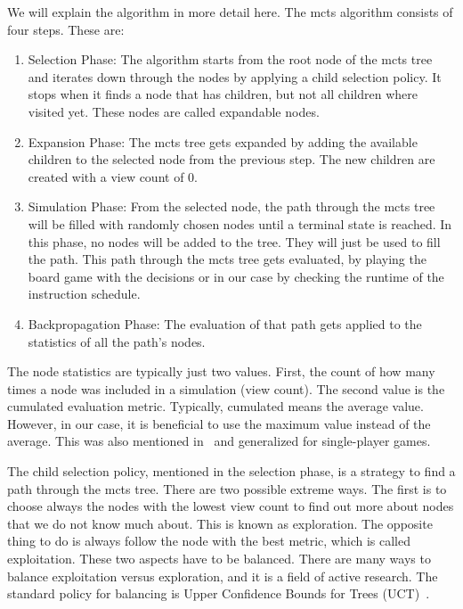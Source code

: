 We will explain the algorithm in more detail here.
The \ac{mcts} algorithm consists of four steps.
These are:
\begin{enumerate}
    \item Selection Phase:
        The algorithm starts from the root node of the \ac{mcts} tree and iterates down through the nodes by applying a child selection policy.
        It stops when it finds a node that has children, but not all children where visited yet.
        These nodes are called expandable nodes.
    \item Expansion Phase:
        The \ac{mcts} tree gets expanded by adding the available children to the selected node from the previous step.
        The new children are created with a view count of 0.
    \item Simulation Phase:
        From the selected node, the path through the \ac{mcts} tree will be filled with randomly chosen nodes until a terminal state is reached.
        In this phase, no nodes will be added to the tree.
        They will just be used to fill the path.
        This path through the \ac{mcts} tree gets evaluated, \eg by playing the board game with the decisions or in our case by checking the runtime of the instruction schedule.
    \item Backpropagation Phase:
        The evaluation of that path gets applied to the statistics of all the path's nodes.
\end{enumerate}
The node statistics are typically just two values.
First, the count of how many times a node was included in a simulation (view count).
The second value is the cumulated evaluation metric.
Typically, cumulated means the average value.
However, in our case, it is beneficial to use the maximum value instead of the average.
This was also mentioned in~\cite{bjornsson2009cadiaplayer} and generalized for single-player games.

The child selection policy, mentioned in the selection phase, is a strategy to find a path through the \ac{mcts} tree.
There are two possible extreme ways.
The first is to choose always the nodes with the lowest view count to find out more about nodes that we do not know much about.
This is known as exploration.
The opposite thing to do is always follow the node with the best metric, which is called exploitation.
These two aspects have to be balanced.
There are many ways to balance exploitation versus exploration, and it is a field of active research.
The standard policy for balancing is Upper Confidence Bounds for Trees (UCT)~\cite{kocsis2006bandit,kocsis2006improved}.

